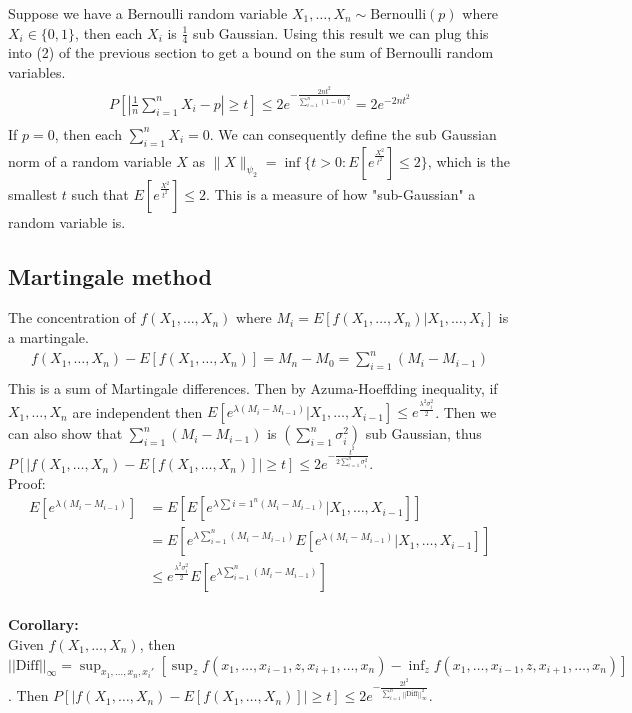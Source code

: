 \documentclass[11pt,a4paper,margin=1in]{article}
\begin{document}
\noindent
Suppose we have a Bernoulli random variable $X_1, \dots, X_n \sim \text{Bernoulli}(p)$ where $X_i \in \{0, 1\}$, 
then each $X_i$ is $\frac{1}{4}$ sub Gaussian. Using this result we can plug this
into (2) of the previous section to get a bound on the sum of Bernoulli random variables.
\begin{gather*}
    P[|\frac{1}{n}\sum_{i=1}^{n}X_i - p| \geq t] \leq 2e^{-\frac{2nt^2}{\sum_{i=1}^{n}(1 - 0)^2}} = 2e^{-2nt^2} \\
\end{gather*}
If $p = 0$, then each $\sum_{i=1}^{n}X_i = 0$. We can consequently define the sub 
Gaussian norm of a random variable $X$ as $\|X\|_{\psi_2} = \inf\{t > 0: E[e^{\frac{X^2}{t^2}}] \leq 2\}$, 
which is the smallest $t$ such that $E[e^{\frac{X^2}{t^2}}] \leq 2$. This is a 
measure of how "sub-Gaussian" a random variable is. \\

\noindent
\subsection*{Martingale method}
The concentration of $f(X_1, \dots, X_n)$ where $M_i = E[f(X_1, \dots, X_n) | X_1, \dots, X_i]$ 
is a martingale.
\begin{gather*}
    f(X_1, \dots, X_n) - E[f(X_1, \dots, X_n)] = M_n - M_0 = \sum_{i=1}^{n}(M_i - M_{i-1}) \\
\end{gather*}
This is a sum of Martingale differences. Then by Azuma-Hoeffding inequality, if
$X_1, \dots, X_n$ are independent then $E[e^{\lambda(M_i - M_{i-1})} | X_1, \dots, X_{i-1}] \leq e^{\frac{\lambda^2\sigma_i^2}{2}}$.
Then we can also show that $\sum_{i=1}^{n}(M_i - M_{i-1})$ is $(\sum_{i=1}^{n}\sigma_i^2)$ sub Gaussian, thus
$P[|f(X_1, \dots, X_n) - E[f(X_1, \dots, X_n)]| \geq t] \leq 2e^{-\frac{t^2}{2\sum_{i=1}^{n}\sigma_i^2}}$. \\

Proof:
\begin{align*}
    E[e^{\lambda(M_i - M_{i-1})}] &= E[E[e^{\lambda\sum{i=1}^{n}(M_i - M_{i-1})} | X_1, \dots, X_{i-1}]] \\
    &= E[e^{\lambda\sum_{i=1}^{n}(M_i - M_{i-1})}E[e^{\lambda(M_i - M_{i-1})} | X_1, \dots, X_{i-1}]] \\
    &\leq e^{\frac{\lambda^2\sigma_i^2}{2}}E[e^{\lambda\sum_{i=1}^{n}(M_i - M_{i-1})}] \\
\end{align*}

\noindent
\textbf{Corollary:} \\
Given $f(X_1, \dots, X_n)$, then $||\text{Diff}||_{\infty} = \sup_{x_1, \dots, x_n, x_i'}[\sup_{z} f(x_1, \dots, x_{i-1}, z, x_{i+1}, \dots, x_n) - \inf_{z} f(x_1, \dots, x_{i-1}, z, x_{i+1}, \dots, x_n)]$.
Then $P[|f(X_1, \dots, X_n) - E[f(X_1, \dots, X_n)]| \geq t] \leq 2e^{-\frac{2t^2}{\sum_{i=1}^{n}||\text{Diff}||_{\infty}^2}}$.
\end{document}

